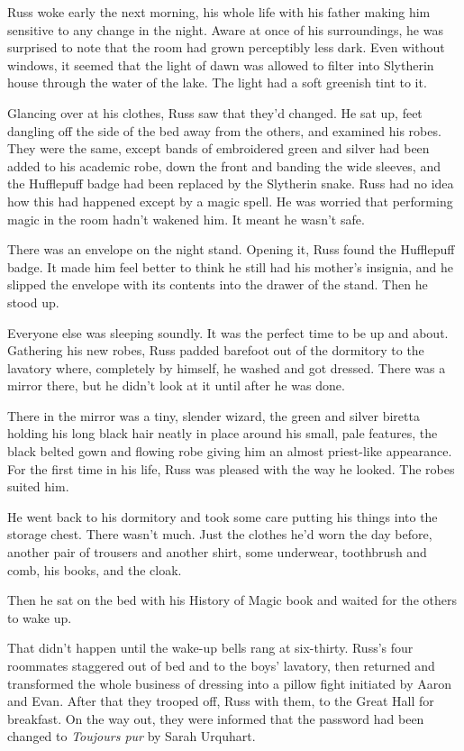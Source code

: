 Russ woke early the next morning, his whole life with his father making him sensitive to any change in the night. Aware at once of his surroundings, he was surprised to note that the room had grown perceptibly less dark. Even without windows, it seemed that the light of dawn was allowed to filter into Slytherin house through the water of the lake. The light had a soft greenish tint to it.

Glancing over at his clothes, Russ saw that they'd changed. He sat up, feet dangling off the side of the bed away from the others, and examined his robes. They were the same, except bands of embroidered green and silver had been added to his academic robe, down the front and banding the wide sleeves, and the Hufflepuff badge had been replaced by the Slytherin snake. Russ had no idea how this had happened except by a magic spell. He was worried that performing magic in the room hadn't wakened him. It meant he wasn't safe.

There was an envelope on the night stand. Opening it, Russ found the Hufflepuff badge. It made him feel better to think he still had his mother's insignia, and he slipped the envelope with its contents into the drawer of the stand. Then he stood up.

Everyone else was sleeping soundly. It was the perfect time to be up and about. Gathering his new robes, Russ padded barefoot out of the dormitory to the lavatory where, completely by himself, he washed and got dressed. There was a mirror there, but he didn't look at it until after he was done.

There in the mirror was a tiny, slender wizard, the green and silver biretta holding his long black hair neatly in place around his small, pale features, the black belted gown and flowing robe giving him an almost priest-like appearance. For the first time in his life, Russ was pleased with the way he looked. The robes suited him.

He went back to his dormitory and took some care putting his things into the storage chest. There wasn't much. Just the clothes he'd worn the day before, another pair of trousers and another shirt, some underwear, toothbrush and comb, his books, and the cloak.

Then he sat on the bed with his History of Magic book and waited for the others to wake up.

That didn't happen until the wake-up bells rang at six-thirty. Russ's four roommates staggered out of bed and to the boys' lavatory, then returned and transformed the whole business of dressing into a pillow fight initiated by Aaron and Evan. After that they trooped off, Russ with them, to the Great Hall for breakfast. On the way out, they were informed that the password had been changed to \emph{Toujours pur} by Sarah Urquhart.


